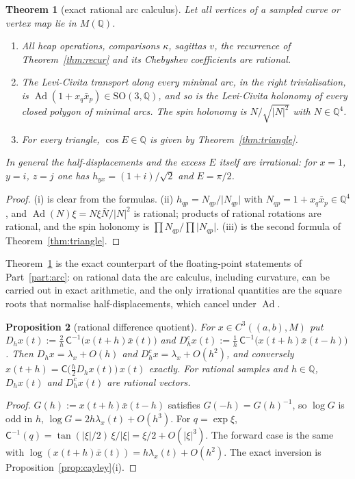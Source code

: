 \documentclass[11pt,reqno]{amsart}
\newtheorem{theorem}{Theorem}[section]
\newtheorem{proposition}[theorem]{Proposition}
\theoremstyle{definition}
\theoremstyle{remark}
\numberwithin{equation}{section}
\newcommand{\Q}{\mathbb{Q}}
\newcommand{\Ad}{\operatorname{Ad}}
\newcommand{\SO}{\mathrm{SO}}
\newcommand{\Cay}{\mathsf{C}}
\begin{document}
\begin{theorem}[exact rational arc calculus]\label{thm:rational}
Let all vertices of a sampled curve or vertex map lie in $M(\Q)$.
\begin{enumerate}[label=(\roman*)]
\item All heap operations, comparisons $\kappa$, sagittas $v$, the recurrence of Theorem~\ref{thm:recur} and its
Chebyshev coefficients are rational.
\item The Levi-Civita transport along every minimal arc, in the right trivialisation, is
$\Ad(1+x_q\bar x_p)\in\SO(3,\Q)$, and so is the Levi-Civita holonomy of every closed polygon of minimal arcs.
The spin holonomy is $N/\sqrt{\lvert N\rvert^2}$ with $N\in\Q^4$.
\item For every triangle, $\cos E\in\Q$ is given by Theorem~\ref{thm:triangle}.
\end{enumerate}
In general the half-displacements and the excess $E$ itself are irrational: for $x=1$, $y=i$, $z=j$ one has
$h_{yx}=(1+i)/\sqrt2$ and $E=\pi/2$.
\end{theorem}
\begin{proof}
(i) is clear from the formulas.  (ii) $h_{qp}=N_{qp}/\lvert N_{qp}\rvert$ with $N_{qp}=1+x_q\bar x_p\in\Q^4$, and
$\Ad(N)\xi=N\xi\bar N/\lvert N\rvert^2$ is rational; products of rational rotations are rational, and the spin
holonomy is $\prod N_{qp}/\prod\lvert N_{qp}\rvert$.  (iii) is the second formula of Theorem~\ref{thm:triangle}.
\end{proof}

Theorem~\ref{thm:rational} is the exact counterpart of the floating-point statements of Part~\ref{part:arc}: on rational data
the arc calculus, including curvature, can be carried out in exact arithmetic, and the only irrational
quantities are the square roots that normalise half-displacements, which cancel under $\Ad$.

\begin{proposition}[rational difference quotient]\label{prop:ratdq}
For $x\in C^3((a,b),M)$ put $D_hx(t):=\tfrac2h\,\Cay^{-1}\bigl(x(t+h)\bar x(t)\bigr)$ and
$D_h^cx(t):=\tfrac1h\,\Cay^{-1}\bigl(x(t+h)\bar x(t-h)\bigr)$.  Then $D_hx=\lambda_x+O(h)$ and
$D^c_hx=\lambda_x+O(h^2)$, and conversely $x(t+h)=\Cay\bigl(\tfrac h2D_hx(t)\bigr)\,x(t)$ exactly.  For rational samples
and $h\in\Q$, $D_hx(t)$ and $D_h^cx(t)$ are rational vectors.
\end{proposition}
\begin{proof}
$G(h):=x(t+h)\bar x(t-h)$ satisfies $G(-h)=G(h)^{-1}$, so $\log G$ is odd in $h$, $\log G=2h\lambda_x(t)+O(h^3)$.
For $q=\exp\xi$, $\Cay^{-1}(q)=\tan(\lvert\xi\rvert/2)\,\xi/\lvert\xi\rvert=\xi/2+O(\lvert\xi\rvert^3)$.  The forward case is
the same with $\log(x(t+h)\bar x(t))=h\lambda_x(t)+O(h^2)$.  The exact inversion is Proposition~\ref{prop:cayley}(i).
\end{proof}
\end{document}
